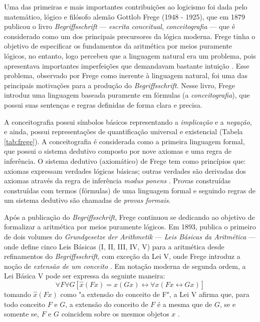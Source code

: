 Uma das primeiras e mais importantes contribuições ao logicismo foi dada pelo matemático, lógico e filósofo alemão Gottlob Frege (1948 - 1925), que em 1879 publicou o livro \textit{Begriffsschrift} --- \textit{escrita conceitual}, \textit{conceitografia} --- que é considerado como um dos principais precursores da lógica moderna. Frege tinha o objetivo de especificar os fundamentos da aritmética por meios puramente lógicos, no entanto, logo percebeu que a linguagem natural era um problema, pois apresentava importantes imperfeições que demandavam bastante intuição \cite{Frege2018}. Esse problema, observado por Frege como inerente à linguagem natural, foi uma das principais motivações para a produção do \textit{Begriffsschrift}. Nesse livro, Frege introduz uma linguagem baseada puramente em fórmulas (a \textit{conceitografia}), que possui suas sentenças e regras definidas de forma clara e precisa.

A conceitografia possui símbolos básicos representando a \textit{implicação} e a \textit{negação}, e ainda, possui representações de quantificação universal e existencial (Tabela \ref{tab:frege}). A conceitografia é considerada como a primeira linguagem formal, que possui o sistema dedutivo composto por nove axiomas e uma regra de inferência. O sistema dedutivo (axiomático) de Frege tem como princípios que: axiomas expressam verdades lógicas básicas; outras verdades são derivadas dos axiomas através da regra de inferência \textit{modus ponens} \cite{SEP-ProofTheory}. Provas construídas construídas com termos (fórmulas) de uma linguagem formal e seguindo regras de um sistema dedutivo são chamadas de \textit{provas formais}.



Após a publicação do \textit{Begriffsschrift}, Frege continuou se dedicando ao objetivo de formalizar a aritmética por meios puramente lógicos. Em 1893, publica o primeiro de dois volumes do \textit{Grundgesetze der Arithmetik} --- \textit{Leis Básicas da Aritmética} --- onde define cinco Leis Básicas (I, II, III, IV, V) para a aritmética desde refinamentos do \textit{Begriffsschrift}, com exceção da Lei V, onde Frege introduz a noção de \textit{extensão de um conceito} \cite{SEP-Logicism}. Em notação moderna de segunda ordem, a Lei Básica V pode ser expressa da seguinte maneira: $$ \forall{F}\forall{G} [\hat{x}(Fx) = \hat{x}(Gx) \leftrightarrow \forall{x}(Fx \leftrightarrow Gx)] $$ tomando $\hat{x}(Fx)$ como "a extensão do conceito de F", a Lei V afirma que, para todo conceito $F$ e $G$, a extensão do conceito de $F$ é a mesma que de $G$, se e somente se, $F$ e $G$ coincidem sobre os mesmos objetos $x$ \cite{HECK1996}.

